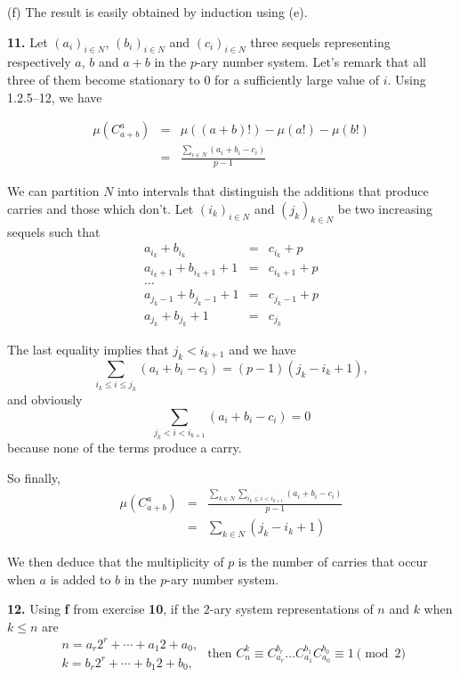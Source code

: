 \documentclass[a4paper,12pt]{article}
\newcommand{\newpar}[1]{\bigskip \noindent \textbf{#1.}}
\newcommand{\subpar}[1]{\medskip \noindent (#1)}
\begin{document}
\subpar{f} The result is easily obtained by induction using (e).

\newpar{11} Let $(a_i)_{i \in N}$, $(b_i)_{i \in N}$ and $(c_i)_{i \in
  N}$ three sequels representing respectively  $a$, $b$ and $a+b$ in
the $p$-ary number system.  Let's remark that all three of them become
stationary to $0$ for a sufficiently large value of $i$. Using
1.2.5--12, we have

\begin{eqnarray*}
  \mu\left( C_{a+b}^a \right) &=& \mu((a+b)!) - \mu(a!) - \mu(b!) \\
  &=& \frac{\sum_{i \in N} (a_i + b_i - c_i)}{p-1}
\end{eqnarray*}

We can partition $N$ into intervals that distinguish the additions
that produce carries and those which don't.  Let $(i_k)_{i \in N}$ and
$(j_k)_{k \in N}$ be two increasing sequels such that
\begin{eqnarray*}
  a_{i_k} + b_{i_k} &=& c_{i_k} + p \\
  a_{i_k+1} + b_{i_k + 1} + 1 &=& c_{i_k + 1} + p \\
  \ldots \\
  a_{j_k - 1} + b_{j_k - 1} + 1 &=& c_{j_k - 1} + p \\
  a_{j_k} + b_{j_k} + 1 &=& c_{j_k}
\end{eqnarray*}

The last equality implies that $j_k < i_{k+1}$ and we have
\[ \sum_{i_k \le i \le j_k} (a_i + b_i - c_i) = (p-1) (j_k - i_k +
1),\]
and obviously
\[ \sum_{j_k < i < i_{k+1}} (a_i + b_i - c_i) = 0\]
because none of the terms produce a carry.

So finally,
\begin{eqnarray*}
  \mu\left( C_{a+b}^a\right) &=& \frac{\sum_{k \in N} \sum_{i_k \le i
      < i_{k+1}} (a_i + b_i - c_i)}{p-1} \\
  &=& \sum_{k \in N} (j_k - i_k + 1)
\end{eqnarray*}

We then deduce that the multiplicity of $p$ is the number of carries
that occur when $a$ is added to $b$ in the $p$-ary number system.

\newpar{12} Using \textbf{f} from exercise \textbf{10}, if the $2$-ary
system representations of $n$ and $k$ when $k \le n$ are
\[
\begin{array}{l}
  n = a_r 2^r + \cdots + a_1 2 + a_0, \\
  k = b_r 2^r + \cdots + b_1 2 + b_0,
\end{array}
\mbox{ then } C_n^k \equiv C_{a_r}^{b_r} \ldots C_{a_1}^{b_1}
C_{a_0}^{b_0} \equiv 1 \pmod 2
\]
\end{document}
